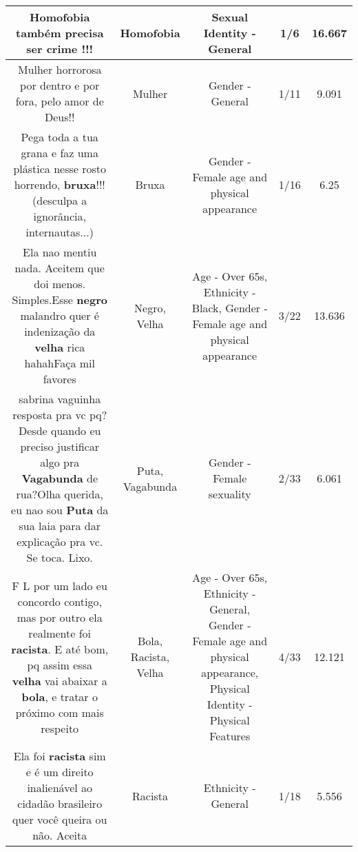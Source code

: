 \documentclass[11pt]{article}
\newlength\mylength
\begin{document}
\begin{center}
\begin{longtable}{|C{.65\mylength}|C{.30\mylength}|C{.12\mylength}|C{.12\mylength}|C{.12\mylength}|}
  \small Homofobia também precisa ser crime !!!\normalsize   & Homofobia & Sexual Identity - General & 1/6 & 16.667 \\  \hline
  \small Mulher horrorosa por dentro e por fora, pelo amor de Deus!!\normalsize   & Mulher & Gender - General & 1/11 & 9.091 \\  \hline
  \small Pega toda a tua grana e faz uma plástica nesse rosto horrendo, \textbf{bruxa}!!!(desculpa a ignorância, internautas...)\normalsize   & Bruxa & Gender - Female age and physical appearance & 1/16 & 6.25 \\  \hline
  \small Ela nao mentiu nada. Aceitem que doi menos. Simples.Esse \textbf{negro} malandro quer é indenização da \textbf{v\textbf{elha}} rica hahahFaça mil favores\normalsize   & Negro, Velha & Age - Over 65s, Ethnicity - Black, Gender - Female age and physical appearance & 3/22 & 13.636 \\  \hline
  \small sabrina vaguinha resposta pra vc pq?Desde quando eu preciso justificar algo pra \textbf{Vagabunda} de rua?Olha querida, eu nao sou \textbf{Puta} da sua laia para dar explicação pra vc. Se toca. Lixo.\normalsize   & Puta, Vagabunda & Gender - Female sexuality & 2/33 & 6.061 \\  \hline
  \small F L por um lado eu concordo contigo, mas por outro ela realmente foi \textbf{racista}. E até bom, pq assim essa \textbf{v\textbf{elha}} vai abaixar a \textbf{bola}, e tratar o próximo com mais respeito\normalsize   & Bola, Racista, Velha & Age - Over 65s, Ethnicity - General, Gender - Female age and physical appearance, Physical Identity - Physical Features & 4/33 & 12.121 \\  \hline
  \small Ela foi \textbf{racista} sim e é um direito inalienável ao cidadão brasileiro quer você queira ou não. Aceita\normalsize   & Racista & Ethnicity - General & 1/18 & 5.556 \\  \hline

\end{longtable}
\end{center}
\end{document}
